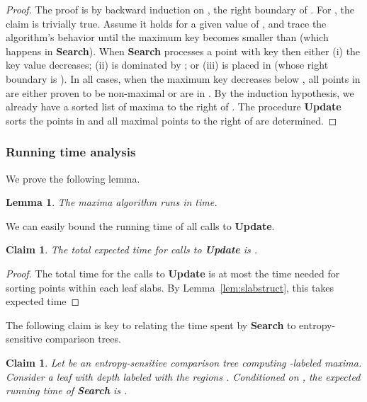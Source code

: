 \documentclass[letterpaper,11pt]{article}
\newtheorem{lemma}[theorem]{Lemma}
\newtheorem{claim}[theorem]{Claim}
\begin{document}
\begin{proof} 
The proof is by backward induction on 
, the right boundary of .
For , the claim is trivially true. 
Assume it holds for a given value of , 
and trace the algorithm's behavior until 
the maximum key becomes smaller than  
(which happens in \textbf{Search}). 
When \textbf{Search}
processes a point  with key  
then either (i) the key value decreases; 
(ii)  is dominated by ; 
or (iii)  is  placed in 
 (whose right boundary is ). 
In all cases, when the maximum key decreases
below , all points in  are 
either proven to be non-maximal
or are in . By the induction hypothesis, 
we already have a sorted
list of maxima to the right of .
The procedure \textbf{Update} sorts the 
points in  and all maximal points 
to the right of  are determined.
\end{proof}


\subsubsection{Running time analysis}\label{sec:runtime}

We prove the following lemma.

\begin{lemma}\label{lem:algoMaxima} 
  The maxima algorithm runs in 
   time.
\end{lemma}

We can easily bound the running time 
of all calls to \textbf{Update}.

\begin{claim}\label{clm:update} 
  The total expected time for
  calls to \textbf{Update} 
  is .
\end{claim}

\begin{proof}
The total time for the calls to 
\textbf{Update} is at most
the time needed for sorting 
points within each leaf slabs. 
By Lemma~\ref{lem:slabstruct}, 
this takes expected time
 
\end{proof}

The following claim is key to relating the time
spent by \textbf{Search} to 
entropy-sensitive comparison trees.

\begin{claim}\label{clm:search} 
  Let  be an entropy-sensitive 
  comparison tree computing -labeled 
  maxima.  Consider a leaf  with depth
   labeled 
  with the regions . 
  Conditioned on , the 
  expected running time of 
  \textup{\textbf{Search}} is 
  .
\end{claim}
\end{document}

